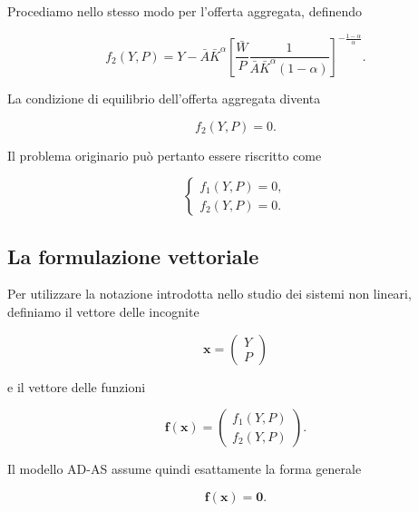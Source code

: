 Procediamo nello stesso modo per l'offerta aggregata, definendo

\begin{equation*}
f_2(Y,P)
=
Y-
\bar{A}\bar{K}^{\alpha}
\left[
\frac{\bar{W}}{P}
\frac{1}{
\bar{A}\bar{K}^{\alpha}(1-\alpha)
}
\right]^{
-\frac{1-\alpha}{\alpha}
}.
\label{eq:adas_f2}
\end{equation*}

La condizione di equilibrio dell'offerta aggregata diventa

\begin{equation*}
    f_2(Y,P)=0.
\end{equation*}

Il problema originario può pertanto essere riscritto come

\begin{equation*}
\begin{cases}
f_1(Y,P)=0,\\
f_2(Y,P)=0.
\end{cases}
\label{eq:adas_solver_system}
\end{equation*}


\subsection{La formulazione vettoriale}

Per utilizzare la notazione introdotta nello studio dei sistemi
non lineari, definiamo il vettore delle incognite

\begin{equation*}
    \mathbf{x}
    =
    \begin{pmatrix}
        Y\\
        P
    \end{pmatrix}
\end{equation*}

e il vettore delle funzioni

\begin{equation*}
\mathbf{f}(\mathbf{x})
=
\begin{pmatrix}
f_1(Y,P)\\
f_2(Y,P)
\end{pmatrix}.
\end{equation*}

Il modello AD-AS assume quindi esattamente la forma generale

\begin{equation*}
    \mathbf{f}(\mathbf{x})=\mathbf{0}.
\end{equation*}

